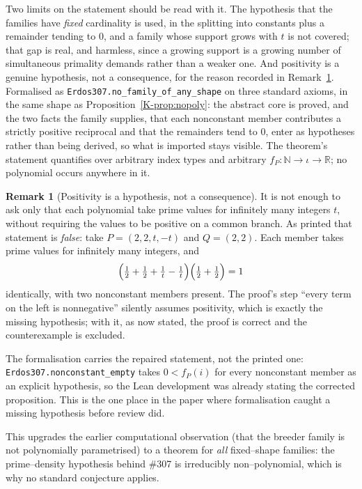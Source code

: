 \documentclass[11pt]{article}
\theoremstyle{definition}
\newtheorem{remark}[theorem]{Remark}
\begin{document}
Two limits on the statement should be read with it. The hypothesis that the families have
\emph{fixed} cardinality is used, in the splitting into constants plus a remainder tending to $0$, and
a family whose support grows with $t$ is not covered; that gap is real, and harmless, since a growing
support is a growing number of simultaneous primality demands rather than a weaker one. And
positivity is a genuine hypothesis, not a consequence, for the reason recorded in
Remark~\ref{rem:nopolyerratum}. Formalised as \texttt{Erdos307.no\_family\_of\_any\_shape} on three
standard axioms, in the same shape as Proposition~\ref{K-prop:nopoly}: the abstract core is proved, and
the two facts the family supplies, that each nonconstant member contributes a strictly positive
reciprocal and that the remainders tend to $0$, enter as hypotheses rather than being derived, so
what is imported stays visible. The theorem's statement quantifies over arbitrary index types and
arbitrary $f_P:\mathbb{N}\to\iota\to\mathbb{R}$; no polynomial occurs anywhere in it.

\begin{remark}[Positivity is a hypothesis, not a consequence]\label{rem:nopolyerratum}
It is not enough to ask only that each polynomial take prime values for infinitely many integers $t$, without requiring the values to be positive on a common branch. As printed that statement is
\emph{false}: take $P=(2,2,t,-t)$ and $Q=(2,2)$. Each member takes prime values for infinitely many
integers, and
\[ \Bigl(\tfrac12+\tfrac12+\tfrac1t-\tfrac1t\Bigr)\Bigl(\tfrac12+\tfrac12\Bigr)=1 \]
identically, with two nonconstant members present. The proof's step ``every term on the left is
nonnegative'' silently assumes positivity, which is exactly the missing hypothesis; with it, as now
stated, the proof is correct and the counterexample is excluded.

The formalisation carries the repaired statement, not the printed one:
\texttt{Erdos307.nonconstant\_empty} takes $0<f_P(i)$ for every nonconstant member as an explicit
hypothesis, so the Lean development was already stating the corrected proposition. This is the one
place in the paper where formalisation caught a missing hypothesis before review did.
\end{remark}

\noindent This upgrades the earlier computational observation (that the breeder family is not
polynomially parametrised) to a theorem for \emph{all} fixed--shape families: the prime--density
hypothesis behind \#307 is irreducibly non--polynomial, which is why no standard conjecture applies.
\end{document}
